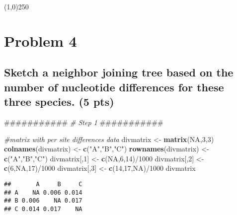 \documentclass[]{article}
\newenvironment{Shaded}{\begin{snugshade}}{\end{snugshade}}
\newcommand{\KeywordTok}[1]{\textcolor[rgb]{0.13,0.29,0.53}{\textbf{{#1}}}}
\newcommand{\DecValTok}[1]{\textcolor[rgb]{0.00,0.00,0.81}{{#1}}}
\newcommand{\StringTok}[1]{\textcolor[rgb]{0.31,0.60,0.02}{{#1}}}
\newcommand{\CommentTok}[1]{\textcolor[rgb]{0.56,0.35,0.01}{\textit{{#1}}}}
\newcommand{\OtherTok}[1]{\textcolor[rgb]{0.56,0.35,0.01}{{#1}}}
\newcommand{\NormalTok}[1]{{#1}}
\begin{document}
\begin{center}
\line(1,0){250}
\end{center}

\section{Problem 4}\label{problem-4}

\subsection{Sketch a neighbor joining tree based on the number of
nucleotide differences for these three species. (5
pts)}\label{sketch-a-neighbor-joining-tree-based-on-the-number-of-nucleotide-differences-for-these-three-species.-5-pts}

\begin{Shaded}
\begin{Highlighting}[]
\NormalTok{###########}
\CommentTok{# Step 1}
\NormalTok{###########}

\CommentTok{#matrix with per site differences data}
\NormalTok{divmatrix <-}\StringTok{ }\KeywordTok{matrix}\NormalTok{(}\OtherTok{NA}\NormalTok{,}\DecValTok{3}\NormalTok{,}\DecValTok{3}\NormalTok{)}
\KeywordTok{colnames}\NormalTok{(divmatrix) <-}\StringTok{ }\KeywordTok{c}\NormalTok{(}\StringTok{"A"}\NormalTok{,}\StringTok{"B"}\NormalTok{,}\StringTok{"C"}\NormalTok{)}
\KeywordTok{rownames}\NormalTok{(divmatrix) <-}\StringTok{ }\KeywordTok{c}\NormalTok{(}\StringTok{"A"}\NormalTok{,}\StringTok{"B"}\NormalTok{,}\StringTok{"C"}\NormalTok{)}
\NormalTok{divmatrix[,}\DecValTok{1}\NormalTok{] <-}\StringTok{ }\KeywordTok{c}\NormalTok{(}\OtherTok{NA}\NormalTok{,}\DecValTok{6}\NormalTok{,}\DecValTok{14}\NormalTok{)/}\DecValTok{1000}
\NormalTok{divmatrix[,}\DecValTok{2}\NormalTok{] <-}\StringTok{ }\KeywordTok{c}\NormalTok{(}\DecValTok{6}\NormalTok{,}\OtherTok{NA}\NormalTok{,}\DecValTok{17}\NormalTok{)/}\DecValTok{1000}
\NormalTok{divmatrix[,}\DecValTok{3}\NormalTok{] <-}\StringTok{ }\KeywordTok{c}\NormalTok{(}\DecValTok{14}\NormalTok{,}\DecValTok{17}\NormalTok{,}\OtherTok{NA}\NormalTok{)/}\DecValTok{1000}
\NormalTok{divmatrix}
\end{Highlighting}
\end{Shaded}

\begin{verbatim}
##       A     B     C
## A    NA 0.006 0.014
## B 0.006    NA 0.017
## C 0.014 0.017    NA
\end{verbatim}
\end{document}
